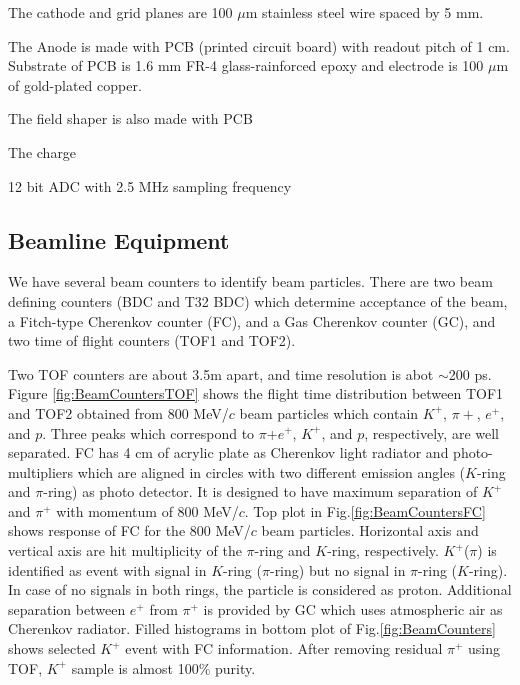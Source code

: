 The cathode and grid planes are 100 $\mu$m stainless steel wire
spaced by 5 mm.

The Anode is made with PCB (printed circuit board) with readout pitch of 1 cm.
Substrate of PCB is 1.6 mm FR-4 glass-rainforced epoxy
and electrode is 100 $\mu$m of gold-plated copper.

The field shaper is also made with PCB


The charge

12 bit ADC with 2.5 MHz sampling frequency

\subsection{Beamline Equipment}

We have several beam counters to identify beam particles.
There are two beam defining counters (BDC and T32 BDC) which determine acceptance of the beam, 
a Fitch-type Cherenkov counter (FC), and a Gas Cherenkov counter (GC), 
and two time of flight counters (TOF1 and TOF2).


Two TOF counters are about 3.5m apart, and time resolution is abot $\sim$200 ps.
Figure \ref{fig:BeamCountersTOF} shows the flight time distribution between TOF1 and TOF2
obtained from 800 MeV/$c$ beam particles which contain  $K^{+}$, $\pi{+}$, $e^{+}$, and $p$. 
Three peaks which correspond to $\pi$+$e^+$, $K^+$, and $p$, respectively, are well separated.
FC has 4 cm of acrylic plate as Cherenkov light radiator and 
photo-multipliers which are aligned in circles with two different emission angles
($K$-ring and $\pi$-ring) as photo detector. It is designed to have maximum separation of 
$K^{+}$ and $\pi^{+}$ with momentum of 800 MeV/$c$.
Top plot in Fig.\ref{fig:BeamCountersFC} shows response of FC for the 800 MeV/$c$ beam particles. 
Horizontal axis and vertical axis are hit multiplicity of the $\pi$-ring and $K$-ring, respectively. 
$K^+$($\pi$) is identified as event with signal in $K$-ring ($\pi$-ring) but no signal in $\pi$-ring ($K$-ring).
In case of no signals in both rings, the particle is considered as proton.
Additional separation between $e^{+}$ from $\pi^+$ is provided by GC 
which uses atmospheric air as Cherenkov radiator. 
Filled histograms in bottom plot of Fig.\ref{fig:BeamCounters} shows selected $K^+$ event with FC information.
After removing residual $\pi^+$ using TOF, $K^+$ sample is almost 100\% purity.

